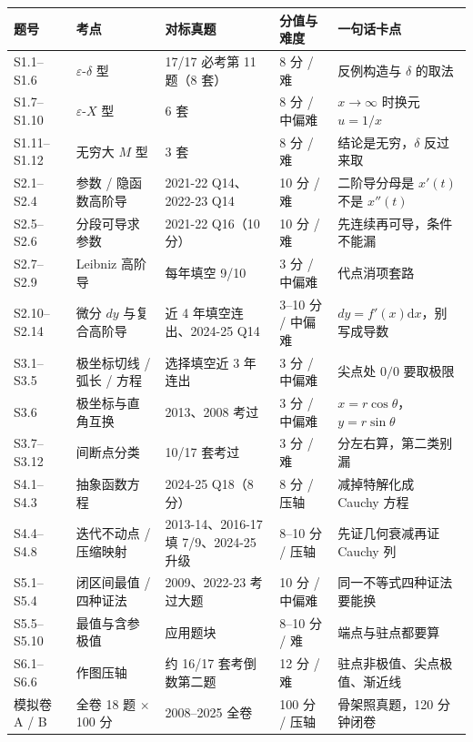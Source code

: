 \documentclass[11pt,a4paper]{ctexart}
\newcommand{\eps}{\varepsilon}
\newcommand{\D}{\mathrm{d}}
\begin{document}
\small\setlength{\tabcolsep}{4pt}
\begin{longtable}{@{}p{2.4cm}p{2.5cm}p{3.3cm}p{1.8cm}p{4.8cm}@{}}
\toprule
题号 & 考点 & 对标真题 & 分值与难度 & 一句话卡点\\
\midrule
\endhead
S1.1--S1.6 & $\eps$-$\delta$ 型 & 17/17 必考第 11 题（8 套） & 8 分 / 难 & 反例构造与 $\delta$ 的取法\\
S1.7--S1.10 & $\eps$-$X$ 型 & 6 套 & 8 分 / 中偏难 & $x\to\infty$ 时换元 $u=1/x$\\
S1.11--S1.12 & 无穷大 $M$ 型 & 3 套 & 8 分 / 难 & 结论是无穷，$\delta$ 反过来取\\
\midrule
S2.1--S2.4 & 参数 / 隐函数高阶导 & 2021-22 Q14、2022-23 Q14 & 10 分 / 难 & 二阶导分母是 $x'(t)$ 不是 $x''(t)$\\
S2.5--S2.6 & 分段可导求参数 & 2021-22 Q16（10 分） & 10 分 / 难 & 先连续再可导，条件不能漏\\
S2.7--S2.9 & Leibniz 高阶导 & 每年填空 9/10 & 3 分 / 中偏难 & 代点消项套路\\
S2.10--S2.14 & 微分 $dy$ 与复合高阶导 & 近 4 年填空连出、2024-25 Q14 & 3--10 分 / 中偏难 & $dy=f'(x)\D x$，别写成导数\\
\midrule
S3.1--S3.5 & 极坐标切线 / 弧长 / 方程 & 选择填空近 3 年连出 & 3 分 / 中偏难 & 尖点处 $0/0$ 要取极限\\
S3.6 & 极坐标与直角互换 & 2013、2008 考过 & 3 分 / 中偏难 & $x=r\cos\theta$，$y=r\sin\theta$\\
S3.7--S3.12 & 间断点分类 & 10/17 套考过 & 3 分 / 难 & 分左右算，第二类别漏\\
\midrule
S4.1--S4.3 & 抽象函数方程 & 2024-25 Q18（8 分） & 8 分 / 压轴 & 减掉特解化成 Cauchy 方程\\
S4.4--S4.8 & 迭代不动点 / 压缩映射 & 2013-14、2016-17 填 7/9、2024-25 升级 & 8--10 分 / 压轴 & 先证几何衰减再证 Cauchy 列\\
\midrule
S5.1--S5.4 & 闭区间最值 / 四种证法 & 2009、2022-23 考过大题 & 10 分 / 中偏难 & 同一不等式四种证法要能换\\
S5.5--S5.10 & 最值与含参极值 & 应用题块 & 8--10 分 / 难 & 端点与驻点都要算\\
\midrule
S6.1--S6.6 & 作图压轴 & 约 16/17 套考倒数第二题 & 12 分 / 难 & 驻点非极值、尖点极值、渐近线\\
\midrule
模拟卷 A / B & 全卷 18 题 $\times$ 100 分 & 2008--2025 全卷 & 100 分 / 压轴 & 骨架照真题，120 分钟闭卷\\
\bottomrule
\end{longtable}
\end{document}
